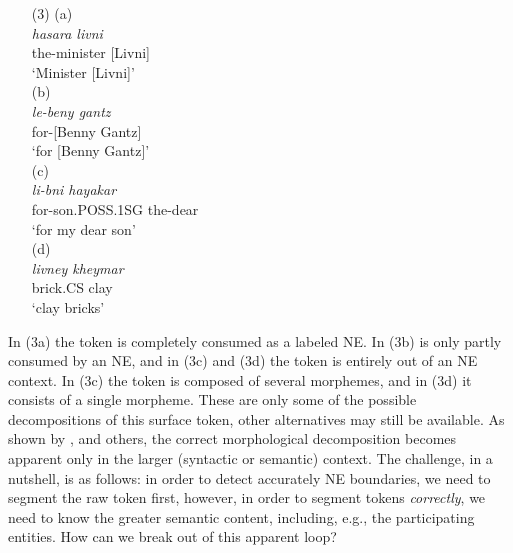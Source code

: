 \documentclass[11pt,a4paper]{article}
\begin{document}
\begin{itemize}
    \item[(3)] (a)  
    \\ \emph{hasara \hspace{1.2cm} livni}
    \\ {\small the-minister \hspace{0.6cm} [Livni]}
    \\ `Minister [Livni]' 
    \\ (b) 
    \\ {\em le-beny \hspace{1cm} gantz}
    \\ {\small for-[Benny \hspace{0.45cm} Gantz]}
    \\ `for [Benny Gantz]'
    \\ (c) 
    \\ {\em li-bni \hspace{2.3cm} hayakar}
    \\ {\small for-son.POSS.1SG \hspace{0.4cm} the-dear}
    \\ `for my dear son'
    \\ (d) 
    \\ {\em livney \hspace{1.2cm} kheymar}
    \\ {\small brick.CS \hspace{0.9cm} clay}
    \\ `clay bricks'
\end{itemize} 
In (3a) the token    is completely consumed as a labeled NE. In (3b)  is only partly consumed by an NE, and in (3c) and (3d) the token is entirely out of an NE context. In (3c) the token is composed of several morphemes, and in (3d) it consists of a single morpheme. These are only some of the possible decompositions of this surface token, other alternatives may still be available.
As shown by , and others,
the correct morphological decomposition becomes apparent only in the larger (syntactic or semantic) context. The challenge, in a nutshell, is as follows: in order to detect accurately NE boundaries, we need to segment the raw token first, however, in order to segment tokens {\em correctly}, we need to know the greater semantic content, including, e.g., the participating entities. How can we break out of this apparent loop?
\end{document}
